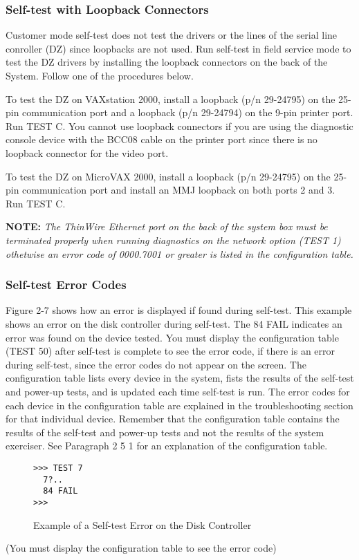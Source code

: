 \subsubsection{Self-test with Loopback Connectors}

Customer mode self-test does not test the drivers or the lines of the serial
line conroller (DZ) since loopbacks are not used. Run self-test in field 
service mode to test the DZ drivers by installing the loopback connectors on
the back of the System. Follow one of the procedures below.

To test the DZ on VAXstation 2000, install a loopback (p/n 29-24795) on
the 25-pin communication port and a loopback (p/n 29-24794) on the 9-pin
printer port. Run TEST C. You cannot use loopback connectors if you are
using the diagnostic console device with the BCC08 cable on the printer
port since there is no loopback connector for the video port.

To test the DZ on MicroVAX 2000, install a loopback (p/n 29-24795) on the
25-pin communication port and install an MMJ loopback on both ports 2
and 3. Run TEST C.

\textbf{NOTE:} \textit{The ThinWire Ethernet port on the back of the 
system box must be terminated properly when running diagnostics on the 
network option (TEST 1) othetwise an error code of 0000.7001 or greater 
is listed in the configuration table.}

\subsubsection{Self-test Error Codes}

Figure 2-7 shows how an error is displayed if found during self-test. This
example shows an error on the disk controller during self-test. The 84 FAIL
indicates an error was found on the device tested. You must display the
configuration table (TEST 50) after self-test is complete to see the error code,
if there is an error during self-test, since the error codes do not appear on
the screen. The configuration table lists every device in the system, fists the
results of the self-test and power-up tests, and is updated each time self-test
is run. The error codes for each device in the configuration table are 
explained in the troubleshooting section for that individual device. Remember
that the configuration table contains the results of the self-test and power-up
tests and not the results of the system exerciser. See Paragraph 2 5 1 for an
explanation of the configuration table.

\begin{figure}[H]
\caption{Example of a Self-test Error on the Disk Controller}
\begin{verbatim}
>>> TEST 7
  7?..
  84 FAIL
>>>
\end{verbatim}
\end{figure}
\label{figure:2-6}

(You must display the configuration table to see the error code)


